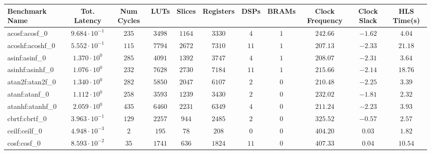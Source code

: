 \begin{tabular}{|l|c|c|c|c|c|c|c|c|c|c|}
\hline
Benchmark Name               & Tot. Latency            & Num Cycles & LUTs       & Slices    & Registers  & DSPs    & BRAMs & Clock Frequency & Clock Slack & HLS Time(s) \\
\hline
acosf:acosf\_0               & $ 9.684 \cdot 10^{-1} $ & $ 235    $ & $ 3498   $ & $ 1164  $ & $ 3330   $ & $ 4   $ & $ 1 $ & $ 242.66      $ & $ -1.62   $ & $ 4.04    $ \\
acoshf:acoshf\_0             & $ 5.552 \cdot 10^{-1} $ & $ 115    $ & $ 7794   $ & $ 2672  $ & $ 7310   $ & $ 11  $ & $ 1 $ & $ 207.13      $ & $ -2.33   $ & $ 21.18   $ \\
asinf:asinf\_0               & $ 1.370 \cdot 10^{0}  $ & $ 285    $ & $ 4091   $ & $ 1392  $ & $ 3747   $ & $ 4   $ & $ 1 $ & $ 208.07      $ & $ -2.31   $ & $ 3.64    $ \\
asinhf:asinhf\_0             & $ 1.076 \cdot 10^{0}  $ & $ 232    $ & $ 7628   $ & $ 2730  $ & $ 7184   $ & $ 11  $ & $ 1 $ & $ 215.66      $ & $ -2.14   $ & $ 18.76   $ \\
atan2f:atan2f\_0             & $ 1.340 \cdot 10^{0}  $ & $ 282    $ & $ 5850   $ & $ 2047  $ & $ 6107   $ & $ 2   $ & $ 0 $ & $ 210.48      $ & $ -2.25   $ & $ 3.39    $ \\
atanf:atanf\_0               & $ 1.112 \cdot 10^{0}  $ & $ 258    $ & $ 3593   $ & $ 1239  $ & $ 3430   $ & $ 2   $ & $ 0 $ & $ 232.02      $ & $ -1.81   $ & $ 2.32    $ \\
atanhf:atanhf\_0             & $ 2.059 \cdot 10^{0}  $ & $ 435    $ & $ 6460   $ & $ 2231  $ & $ 6349   $ & $ 4   $ & $ 0 $ & $ 211.24      $ & $ -2.23   $ & $ 3.93    $ \\
cbrtf:cbrtf\_0               & $ 3.963 \cdot 10^{-1} $ & $ 129    $ & $ 2257   $ & $ 944   $ & $ 2485   $ & $ 2   $ & $ 0 $ & $ 325.52      $ & $ -0.57   $ & $ 2.57    $ \\
ceilf:ceilf\_0               & $ 4.948 \cdot 10^{-3} $ & $ 2      $ & $ 195    $ & $ 78    $ & $ 208    $ & $ 0   $ & $ 0 $ & $ 404.20      $ & $ 0.03    $ & $ 1.82    $ \\
cosf:cosf\_0                 & $ 8.593 \cdot 10^{-2} $ & $ 35     $ & $ 1741   $ & $ 636   $ & $ 1824   $ & $ 11  $ & $ 0 $ & $ 407.33      $ & $ 0.04    $ & $ 10.54   $ \\

\end{tabular}
